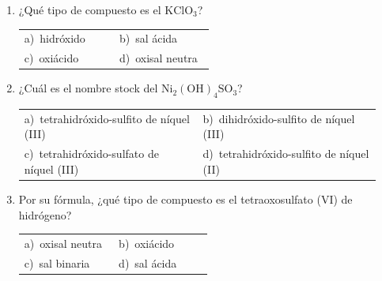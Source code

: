 \documentclass[11pt,a4paper]{article}
\begin{document}
\begin{enumerate}[label=\textbf{\arabic*.},leftmargin=*,itemsep=11pt,topsep=0pt]
\item \begin{minipage}[t]{\linewidth}
¿Qué tipo de compuesto es el $\mathrm{KClO_{3}}$?

\vspace{5pt}
\begin{tabular}{@{}p{0.47\linewidth}p{0.47\linewidth}@{}}
a)~hidróxido & b)~sal ácida \\
c)~oxiácido & d)~oxisal neutra \\
\end{tabular}
\end{minipage}

\item \begin{minipage}[t]{\linewidth}
¿Cuál es el nombre stock del $\mathrm{Ni_{2}(OH)_{4}SO_{3}}$?

\vspace{5pt}
\begin{tabular}{@{}p{0.47\linewidth}p{0.47\linewidth}@{}}
a)~tetrahidróxido-sulfito de níquel (III) & b)~dihidróxido-sulfito de níquel (III) \\
c)~tetrahidróxido-sulfato de níquel (III) & d)~tetrahidróxido-sulfito de níquel (II) \\
\end{tabular}
\end{minipage}

\item \begin{minipage}[t]{\linewidth}
Por su fórmula, ¿qué tipo de compuesto es el tetraoxosulfato (VI) de hidrógeno?

\vspace{5pt}
\begin{tabular}{@{}p{0.47\linewidth}p{0.47\linewidth}@{}}
a)~oxisal neutra & b)~oxiácido \\
c)~sal binaria & d)~sal ácida \\
\end{tabular}
\end{minipage}

\end{enumerate}
\end{document}
